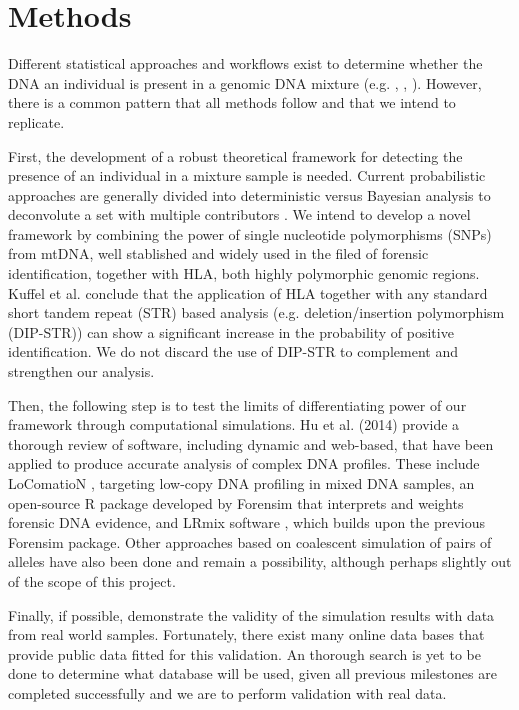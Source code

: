 \documentclass[10pt]{article}
\begin{document}

\section{Methods}

Different statistical approaches and workflows exist to determine whether the DNA an individual is present in a genomic DNA mixture (e.g. \cite{Cowell2015}, \cite{Homer2008}, \cite{Vohr2015}). However, there is a common pattern that all methods follow and that we intend to replicate. 

First, the development of a robust theoretical framework for detecting the presence of an individual in a mixture sample is needed. Current probabilistic approaches are generally divided into deterministic versus Bayesian analysis to deconvolute a set with multiple contributors \cite{Hu2014}. We intend to develop a novel framework by combining the power of single nucleotide polymorphisms (SNPs) from mtDNA, well stablished and widely used in the filed of forensic identification, together with HLA, both highly polymorphic genomic regions. Kuffel et al. \cite{Kuffel2019} conclude that the application of HLA together with any standard short tandem repeat (STR) based analysis (e.g. deletion/insertion polymorphism (DIP-STR)) can show a significant increase in the probability of positive identification. We do not discard the use of DIP-STR to complement and strengthen our analysis.

Then, the following step is to test the limits of differentiating power of our framework through computational simulations. Hu et al. (2014) \cite{Hu2014} provide a thorough review of software, including dynamic and web-based, that have been applied to produce accurate analysis of complex DNA profiles. These include LoComatioN \cite{Gill2007}, targeting low-copy DNA profiling in mixed DNA samples, an open-source R package developed by Forensim \cite{Haned2011forensim} that interprets and weights forensic DNA evidence, and LRmix software \cite{Haned2011analysis}, which builds upon the previous Forensim package. Other approaches based on coalescent simulation of pairs of alleles have also been done and remain a possibility, although perhaps slightly out of the scope of this project.

Finally, if possible, demonstrate the validity of the simulation results with data from real world samples. Fortunately, there exist many online data bases that provide public data fitted for this validation. An thorough search is yet to be done to determine what database will be used, given all previous milestones are completed successfully and we are to perform validation with real data.
\end{document}

